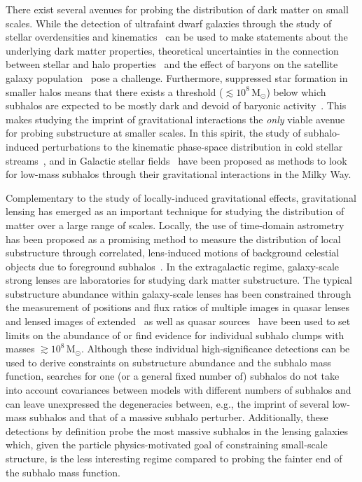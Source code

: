 \documentclass[twocolumn]{aastex63}
\begin{document}
There exist several avenues for probing the distribution of dark matter on small scales. While the detection of ultrafaint dwarf galaxies through the study of stellar overdensities and kinematics~\citep{0706.2687,1503.02079,1503.02584,1508.03622} can be used to make statements about the underlying dark matter properties, theoretical uncertainties in the connection between stellar and halo properties~\citep{1809.05542,1804.03097} and the effect of baryons on the satellite galaxy population~\citep{1608.01849,1701.03792,1812.00044,1811.11791} pose a challenge. Furthermore, suppressed star formation in smaller halos means that there exists a threshold ($\lesssim 10^8\,\mathrm{M}_\odot$) below which subhalos are expected to be mostly dark and devoid of baryonic activity~\citep{1992MNRAS.256P..43E,1611.02281,1607.03127}. This makes studying the imprint of gravitational interactions the \emph{only} viable avenue for probing substructure at smaller scales. In this spirit, the study of subhalo-induced perturbations to the kinematic phase-space distribution in cold stellar streams~\citep{astro-ph/9807243,1109.6022,1303.4342,1804.06854,1811.03631}, and in Galactic stellar fields~\citep{1711.03554} have been proposed as methods to look for low-mass subhalos through their gravitational interactions in the Milky Way.

Complementary to the study of locally-induced gravitational effects, gravitational lensing has emerged as an important technique for studying the distribution of matter over a large range of scales. Locally, the use of time-domain astrometry has been proposed as a promising method to measure the distribution of local substructure through correlated, lens-induced motions of background celestial objects due to foreground subhalos~\citep{2018JCAP...07..041V}. In the extragalactic regime, galaxy-scale strong lenses are laboratories for studying dark matter substructure. The typical substructure abundance within galaxy-scale lenses has been constrained through the measurement of positions and flux ratios of multiple images in quasar lenses~\citep{2002ApJ...572...25D,2019arXiv190504182H} and lensed images of extended~\citep{0910.0760,1002.4708,1201.3643,1601.01388} as well as quasar sources~\citep{1109.0548,1402.1496,1701.05188} have been used to set limits on the abundance of or find evidence for individual subhalo clumps with masses $\gtrsim 10^8\,\mathrm{M}_\odot$. Although these individual high-significance detections can be used to derive constraints on substructure abundance and the subhalo mass function, searches for one (or a general fixed number of) subhalos do not take into account covariances between models with different numbers of subhalos and can leave unexpressed the degeneracies between, e.g., the imprint of several low-mass subhalos and that of a massive subhalo perturber. Additionally, these detections by definition probe the most massive subhalos in the lensing galaxies which, given the particle physics-motivated goal of constraining small-scale structure, is the less interesting regime compared to probing the fainter end of the subhalo mass function.
\end{document}
